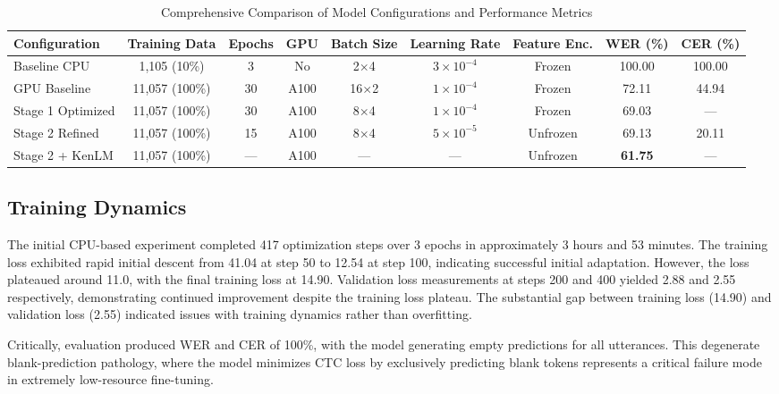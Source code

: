 \documentclass[conference]{IEEEtran}
\begin{document}
\begin{table}[!t]
\caption{Comprehensive Comparison of Model Configurations and Performance Metrics}
\label{tab:fullresults}
\centering
\begin{tabular}{|l|c|c|c|c|c|c|c|c|}
\hline
\textbf{Configuration} & \textbf{Training Data} & \textbf{Epochs} & \textbf{GPU} & \textbf{Batch Size} & \textbf{Learning Rate} & \textbf{Feature Enc.} & \textbf{WER (\%)} & \textbf{CER (\%)} \\
\hline
Baseline CPU & 1,105 (10\%) & 3 & No & 2$\times$4 & $3 \times 10^{-4}$ & Frozen & 100.00 & 100.00 \\
\hline
GPU Baseline & 11,057 (100\%) & 30 & A100 & 16$\times$2 & $1 \times 10^{-4}$ & Frozen & 72.11 & 44.94 \\
\hline
Stage 1 Optimized & 11,057 (100\%) & 30 & A100 & 8$\times$4 & $1 \times 10^{-4}$ & Frozen & 69.03 & --- \\
\hline
Stage 2 Refined & 11,057 (100\%) & 15 & A100 & 8$\times$4 & $5 \times 10^{-5}$ & Unfrozen & 69.13 & 20.11 \\
\hline
Stage 2 + KenLM & 11,057 (100\%) & --- & A100 & --- & --- & Unfrozen & \textbf{61.75} & --- \\
\hline
\end{tabular}
\end{table}

\subsection{Training Dynamics}

The initial CPU-based experiment completed 417 optimization steps over 3 epochs in approximately 3 hours and 53 minutes. The training loss exhibited rapid initial descent from 41.04 at step 50 to 12.54 at step 100, indicating successful initial adaptation. However, the loss plateaued around 11.0, with the final training loss at 14.90. Validation loss measurements at steps 200 and 400 yielded 2.88 and 2.55 respectively, demonstrating continued improvement despite the training loss plateau. The substantial gap between training loss (14.90) and validation loss (2.55) indicated issues with training dynamics rather than overfitting.

Critically, evaluation produced WER and CER of 100\%, with the model generating empty predictions for all utterances. This degenerate blank-prediction pathology, where the model minimizes CTC loss by exclusively predicting blank tokens represents a critical failure mode in extremely low-resource fine-tuning.
\end{document}
